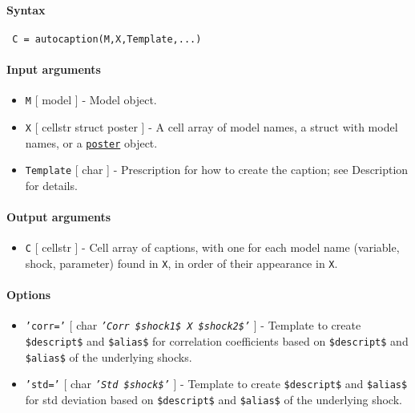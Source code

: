 


	\paragraph{Syntax}
 
 \begin{verbatim}
 C = autocaption(M,X,Template,...)
 \end{verbatim}
 
 \paragraph{Input arguments}
 
 \begin{itemize}
 \item
   \texttt{M} {[} model {]} - Model object.
 \item
   \texttt{X} {[} cellstr \textbar{} struct \textbar{} poster {]} - A
   cell array of model names, a struct with model names, or a
   \href{poster/Contents}{\texttt{poster}} object.
 \item
   \texttt{Template} {[} char {]} - Prescription for how to create the
   caption; see Description for details.
 \end{itemize}
 
 \paragraph{Output arguments}
 
 \begin{itemize}
 \item
   \texttt{C} {[} cellstr {]} - Cell array of captions, with one for each
   model name (variable, shock, parameter) found in \texttt{X}, in order
   of their appearance in \texttt{X}.
 \end{itemize}
 
 \paragraph{Options}
 
 \begin{itemize}
 \item
   \texttt{'corr='} {[} char \textbar{}
   \emph{\texttt{'Corr \$shock1\$ X \$shock2\$'}} {]} - Template to
   create \texttt{\$descript\$} and \texttt{\$alias\$} for correlation
   coefficients based on \texttt{\$descript\$} and \texttt{\$alias\$} of
   the underlying shocks.
 \item
   \texttt{'std='} {[} char \textbar{} \emph{\texttt{'Std \$shock\$'}}
   {]} - Template to create \texttt{\$descript\$} and \texttt{\$alias\$}
   for std deviation based on \texttt{\$descript\$} and
   \texttt{\$alias\$} of the underlying shock.
 \end{itemize}
 
